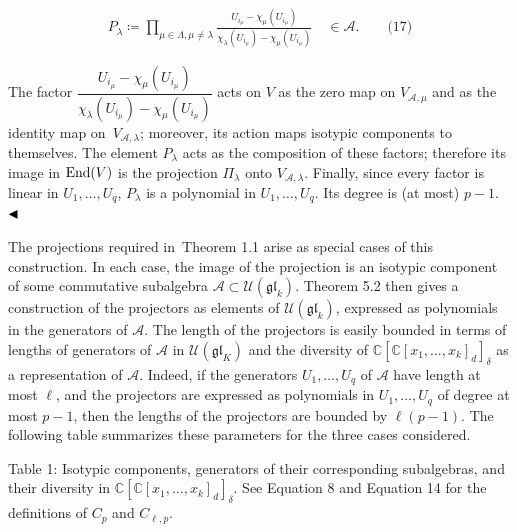 \documentclass[10pt,a4paper]{article}
\begin{document}
\[\begin{aligned}
\displaystyle P_{\lambda}\coloneqq\prod_{\mu\in\Lambda,\mu\neq\lambda}\frac{U_{i_{\mu}}-\chi_{\mu}(U_{i_{\mu}})}{\chi_{\lambda}(U_{i_{\mu}})-\chi_{\mu}(U_{i_{\mu}})}\quad\in\mathcal{A}.\qquad\text{(17)}
\end{aligned}\]


The factor $\dfrac{U_{i_{\mu}}-\chi_{\mu}(U_{i_{\mu}})}{\chi_{\lambda}(U_{i_{\mu}})-\chi_{\mu}(U_{i_{\mu}})}$ acts on $V$ as the zero map on $V_{\mathcal{A},\mu}$ and as the identity map on $V_{\mathcal{A},\lambda}$; moreover, its action maps isotypic components to themselves. The element $P_{\lambda}$ acts as the composition of these factors; therefore its image in $\textnormal{End}(V)$ is the projection $\Pi_{\lambda}$ onto $V_{\mathcal{A},\lambda}$. Finally, since every factor is linear in $U_{1},\ldots,U_{q}$, $P_{\lambda}$ is a polynomial in $U_{1},\ldots,U_{q}$. Its degree is (at most) $p-1$.
$\hfill\blacktriangleleft$





The projections required in Theorem 1.1 arise as special cases of this construction.
In each case, the image of the projection is an isotypic component of some commutative subalgebra $\mathcal{A}\subset\mathcal{U}(\mathfrak{gl}_{k})$.
Theorem 5.2 then gives a construction of the projectors as elements of $\mathcal{U}(\mathfrak{gl}_{k})$, expressed as polynomials in the generators of $\mathcal{A}$.
The length of the projectors is easily bounded in terms of lengths of generators of $\mathcal{A}$ in $\mathcal{U}(\mathfrak{gl}_{K})$ and the diversity of $\mathbb{C}[\mathbb{C}[x_{1},\ldots,x_{k}]_{d}]_{\delta}$ as a representation of $\mathcal{A}$.
Indeed, if the generators $U_{1},\dots,U_{q}$ of $\mathcal{A}$ have length at most $\ell$, and the projectors are expressed as polynomials in $U_{1},\dots,U_{q}$ of degree at most $p-1$, then the lengths of the projectors are bounded by $\ell(p-1)$. The following table summarizes these parameters for the three cases considered.




Table 1: 
Isotypic components, generators of their corresponding subalgebras, and their diversity in $\mathbb{C}[\mathbb{C}[x_{1},\ldots,x_{k}]_{d}]_{\delta}$.
See Equation 8 and Equation 14 for the definitions of $C_{p}$ and $C_{\ell,p}$.
\end{document}
